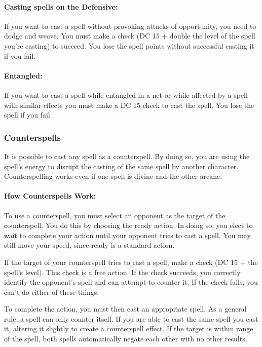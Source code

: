 \documentclass[../VancianToPsionics.tex]{subfiles}
\begin{document}
\paragraph{Casting spells on the Defensive:} If you want to cast a spell without provoking attacks of opportunity, you need to dodge and weave. You must make a  check (DC 15 + double the level of the spell you're casting) to succeed. You lose the spell points without successful casting it if you fail.

\paragraph{Entangled:} If you want to cast a spell while entangled in a net or while affected by a spell with similar effects you must make a DC 15  check to cast the spell. You lose the spell if you fail.

\subsubsection{Counterspells}
\label{sec:Counterspells}
It is possible to cast any spell as a counterspell. By doing so, you are using the spell's energy to disrupt the casting of the same spell by another character. Counterspelling works even if one spell is divine and the other arcane.

\paragraph{How Counterspells Work:}
To use a counterspell, you must select an opponent as the target of the counterspell. You do this by choosing the ready action. In doing so, you elect to wait to complete your action until your opponent tries to cast a spell. You may still move your speed, since ready is a standard action.

If the target of your counterspell tries to cast a spell, make a  check (DC 15 + the spell's level). This check is a free action. If the check succeeds, you correctly identify the opponent's spell and can attempt to counter it. If the check fails, you can't do either of these things.

To complete the action, you must then cast an appropriate spell. As a general rule, a spell can only counter itself. If you are able to cast the same spell you cast it, altering it slightly to create a counterspell effect. If the target is within range of the spell, both spells automatically negate each other with no other results.
\end{document}
